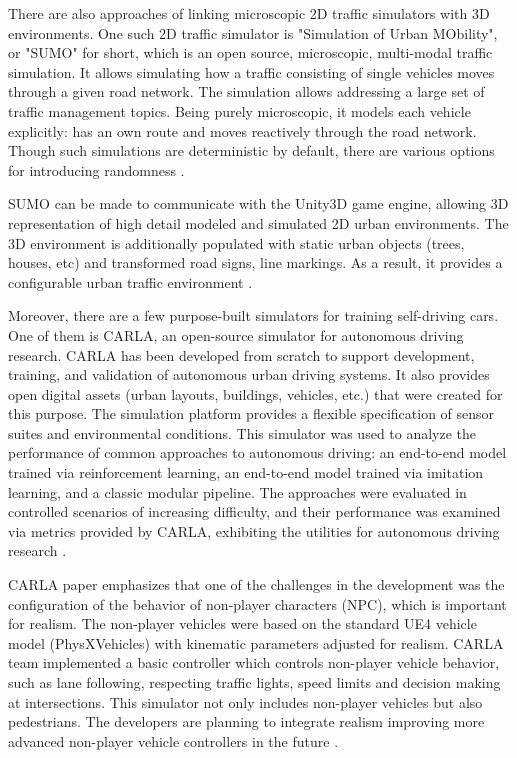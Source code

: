 \documentclass{VUMIFPS-master-intro}
\begin{document}
There are also approaches of linking microscopic 2D traffic simulators with 3D environments. One such 2D traffic simulator is "Simulation of Urban MObility", or "SUMO" for short, which is an open source, microscopic, multi-modal traffic simulation. It allows simulating how a traffic consisting of single vehicles moves through a given road network. The simulation allows addressing a large set of traffic management topics. Being purely microscopic, it models each vehicle explicitly: has an own route and moves reactively through the road network. Though such simulations are deterministic by default, there are various options for introducing randomness \cite{Behrisch2011}.

SUMO can be made to communicate with the Unity3D game engine, allowing 3D representation of high detail modeled and simulated 2D urban environments. The 3D environment is additionally populated with static urban objects (trees, houses, etc) and transformed road signs, line markings. As a result, it provides a configurable urban traffic environment \cite{Biurrun2017}. 

Moreover, there are a few purpose-built simulators for training self-driving cars. One of them is CARLA, an open-source simulator for autonomous driving research. CARLA has been developed from scratch to support development, training, and validation of autonomous urban driving systems. It also provides open digital assets (urban layouts, buildings, vehicles, etc.) that were created for this purpose. The simulation platform provides a flexible specification of sensor suites and environmental conditions. This simulator was used to analyze the performance of common approaches to autonomous driving: an end-to-end model trained via reinforcement learning, an end-to-end model trained via imitation learning, and a classic modular pipeline. The approaches were evaluated in controlled scenarios of increasing difficulty, and their performance was examined via metrics provided by CARLA, exhibiting the utilities for autonomous driving research \cite{Dosovitskiy2017}. 

CARLA paper emphasizes that one of the challenges in the development was the configuration of the behavior of non-player characters (NPC), which is important for realism. The non-player vehicles were based on the standard UE4 vehicle model (PhysXVehicles) with kinematic parameters adjusted for realism. CARLA team implemented a basic controller which controls non-player vehicle behavior, such as lane following, respecting traffic lights, speed limits and decision making at intersections. This simulator not only includes non-player vehicles but also pedestrians. The developers are planning to integrate realism improving more advanced non-player vehicle controllers in the future \cite{Dosovitskiy2017}. 
\end{document}

